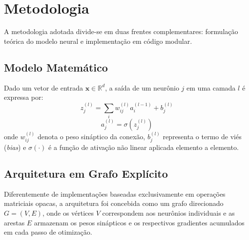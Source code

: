﻿\section{Metodologia}
\label{sec:metodologia}

A metodologia adotada divide-se em duas frentes complementares: formulação teórica do modelo neural e implementação em código modular.

\subsection{Modelo Matemático}
Dado um vetor de entrada $\mathbf{x} \in \mathbb{R}^{d}$, a saída de um neurônio $j$ em uma camada $l$ é expressa por:
\begin{equation}
    z_j^{(l)} = \sum_{i} w_{ij}^{(l)} a_i^{(l-1)} + b_j^{(l)}
\end{equation}
\begin{equation}
    a_j^{(l)} = \sigma\left(z_j^{(l)}\right)
\end{equation}
onde $w_{ij}^{(l)}$ denota o peso sináptico da conexão, $b_j^{(l)}$ representa o termo de viés (\textit{bias}) e $\sigma(\cdot)$ é a função de ativação não linear aplicada elemento a elemento.

\subsection{Arquitetura em Grafo Explícito}
Diferentemente de implementações baseadas exclusivamente em operações matriciais opacas, a arquitetura foi concebida como um grafo direcionado $G = (V, E)$, onde os vértices $V$ correspondem aos neurônios individuais e as arestas $E$ armazenam os pesos sinápticos e os respectivos gradientes acumulados em cada passo de otimização.
